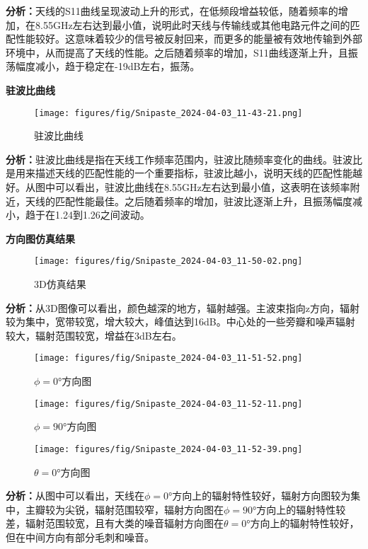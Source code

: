 \documentclass[12pt,hyperref,a4paper,UTF8]{ctexart}
\begin{document}
\textbf{分析：}天线的S11曲线呈现波动上升的形式，在低频段增益较低，随着频率的增加，在8.55GHz左右达到最小值，说明此时天线与传输线或其他电路元件之间的匹配性能较好。这意味着较少的信号被反射回来，而更多的能量被有效地传输到外部环境中，从而提高了天线的性能。之后随着频率的增加，S11曲线逐渐上升，且振荡幅度减小，趋于稳定在-19dB左右，振荡。

\textbf{驻波比曲线}

\begin{figure}[H]
    \centering
    \texttt{[image: figures/fig/Snipaste\_2024-04-03\_11-43-21.png]}
    \caption{驻波比曲线}
    \label{fig:enter-label}
\end{figure}

\textbf{分析：}驻波比曲线是指在天线工作频率范围内，驻波比随频率变化的曲线。驻波比是用来描述天线的匹配性能的一个重要指标，驻波比越小，说明天线的匹配性能越好。从图中可以看出，驻波比曲线在8.55GHz左右达到最小值，这表明在该频率附近，天线的匹配性能最佳。之后随着频率的增加，驻波比逐渐上升，且振荡幅度减小，趋于在1.24到1.26之间波动。


\textbf{方向图仿真结果}
\begin{figure}[H]
    \centering
    \texttt{[image: figures/fig/Snipaste\_2024-04-03\_11-50-02.png]}
    \caption{3D仿真结果}
    \label{fig:enter-label}
\end{figure}
\textbf{分析：}从3D图像可以看出，颜色越深的地方，辐射越强。主波束指向z方向，辐射较为集中，宽带较宽，增大较大，峰值达到16dB。中心处的一些旁瓣和噪声辐射较大，辐射范围较宽，增益在3dB左右。

\begin{figure}[H]
    \centering
    \texttt{[image: figures/fig/Snipaste\_2024-04-03\_11-51-52.png]}
    \caption{$\phi=0°$方向图}
    \label{fig:enter-label}
\end{figure}

\begin{figure}[H]
    \centering
    \texttt{[image: figures/fig/Snipaste\_2024-04-03\_11-52-11.png]}
    \caption{$\phi=90°$方向图}
    \label{fig:enter-label}
\end{figure}

\begin{figure}[H]
    \centering
    \texttt{[image: figures/fig/Snipaste\_2024-04-03\_11-52-39.png]}
    \caption{$\theta=0°$方向图}
    \label{fig:enter-label}
\end{figure}

\textbf{分析：}从图中可以看出，天线在$\phi=0°$方向上的辐射特性较好，辐射方向图较为集中，主瓣较为尖锐，辐射范围较窄，辐射方向图在$\phi=90°$方向上的辐射特性较差，辐射范围较宽，且有大类的噪音辐射方向图在$\theta=0°$方向上的辐射特性较好，但在中间方向有部分毛刺和噪音。
\end{document}
